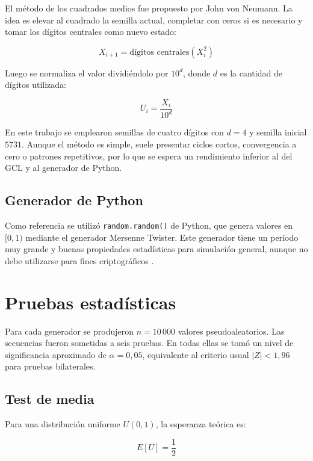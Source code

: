 \documentclass{article}
\begin{document}
El método de los cuadrados medios fue propuesto por John von Neumann. La idea es
elevar al cuadrado la semilla actual, completar con ceros si es necesario y tomar
los dígitos centrales como nuevo estado:

\begin{equation}
    X_{i+1} = \text{dígitos centrales}(X_i^2)
\end{equation}

Luego se normaliza el valor dividiéndolo por $10^d$, donde $d$ es la cantidad de
dígitos utilizada:

\begin{equation}
    U_i = \frac{X_i}{10^d}
\end{equation}

En este trabajo se emplearon semillas de cuatro dígitos con $d = 4$ y semilla inicial
$5731$. Aunque el método es simple, suele presentar ciclos cortos, convergencia a
cero o patrones repetitivos, por lo que se espera un rendimiento inferior al del
GCL y al generador de Python.

\subsection{Generador de Python}

Como referencia se utilizó \texttt{random.random()} de Python, que genera valores
en $[0,1)$ mediante el generador Mersenne Twister. Este generador tiene un período
muy grande y buenas propiedades estadísticas para simulación general, aunque no
debe utilizarse para fines criptográficos \cite{python_random}.

\section{Pruebas estadísticas}

Para cada generador se produjeron $n = 10\,000$ valores pseudoaleatorios. Las
secuencias fueron sometidas a seis pruebas. En todas ellas se tomó un nivel de
significancia aproximado de $\alpha = 0{,}05$, equivalente al criterio usual
$|Z| < 1{,}96$ para pruebas bilaterales.

\subsection{Test de media}

Para una distribución uniforme $U(0,1)$, la esperanza teórica es:

\begin{equation}
    E[U] = \frac{1}{2}
\end{equation}
\end{document}
